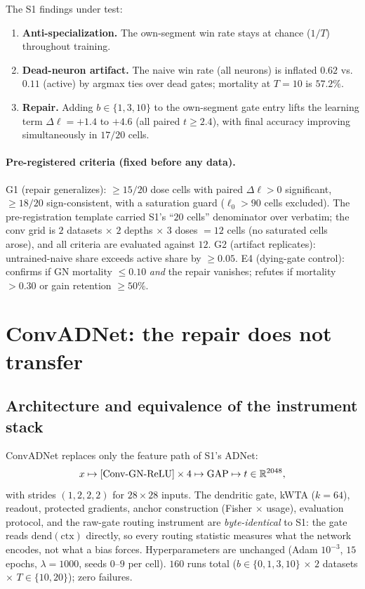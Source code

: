 \documentclass[review]{elsarticle}
\begin{document}
The S1 findings under test:

\begin{enumerate}
\item \textbf{Anti-specialization.} The own-segment win rate stays at
chance ($1/T$) throughout training.
\item \textbf{Dead-neuron artifact.} The naive win rate (all neurons)
is inflated $0.62$ vs.\ $0.11$ (active) by argmax ties over dead
gates; mortality at $T{=}10$ is $57.2\%$.
\item \textbf{Repair.} Adding $b \in \{1,3,10\}$ to the own-segment
gate entry lifts the learning term $\Delta\ell = +1.4$ to $+4.6$
(all paired $t \ge 2.4$), with final accuracy improving
simultaneously in $17/20$ cells.
\end{enumerate}

\paragraph{Pre-registered criteria (fixed before any data).}
G1 (repair generalizes): $\ge 15/20$ dose cells with paired
$\Delta\ell > 0$ significant, $\ge 18/20$ sign-consistent, with a
saturation guard ($\ell_0 > 90$ cells excluded). The pre-registration
template carried S1's ``$20$ cells'' denominator over verbatim; the
conv grid is $2$ datasets $\times$ $2$ depths $\times$ $3$ doses
$= 12$ cells (no saturated cells arose), and all criteria are
evaluated against $12$. G2 (artifact
replicates): untrained-naive share exceeds active share by
$\ge 0.05$. E4 (dying-gate control): confirms if GN mortality
$\le 0.10$ \emph{and} the repair vanishes; refutes if mortality
$> 0.30$ or gain retention $\ge 50\%$.

\section{ConvADNet: the repair does not transfer}
\label{sec:conv}

\subsection{Architecture and equivalence of the instrument stack}

ConvADNet replaces only the feature path of S1's ADNet:
\[
x \mapsto [\mathrm{Conv}{\text -}\mathrm{GN}{\text -}\mathrm{ReLU}]
\times 4 \mapsto \mathrm{GAP} \mapsto t \in \mathbb{R}^{2048},
\]
with strides $(1,2,2,2)$ for $28{\times}28$ inputs. The dendritic
gate, kWTA ($k{=}64$), readout, protected gradients, anchor
construction (Fisher $\times$ usage), evaluation protocol, and the
raw-gate routing instrument are \emph{byte-identical} to S1: the gate
reads $\mathrm{dend}(\mathrm{ctx})$ directly, so every routing
statistic measures what the network encodes, not what a bias forces.
Hyperparameters are unchanged (Adam $10^{-3}$, $15$ epochs,
$\lambda{=}1000$, seeds $0$--$9$ per cell). $160$ runs total
($b \in \{0,1,3,10\}$ $\times$ $2$ datasets $\times$ $T \in
\{10,20\}$); zero failures.
\end{document}
